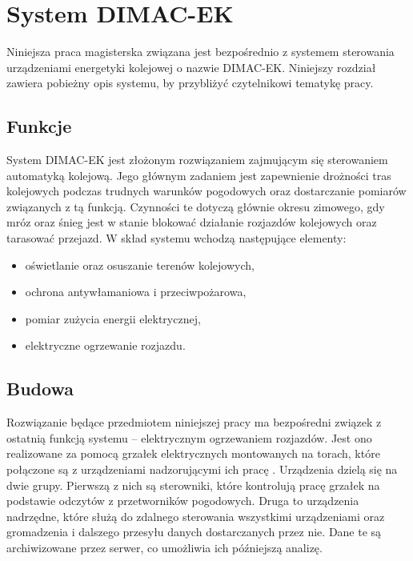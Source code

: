 \chapter{System DIMAC-EK}

Niniejsza praca magisterska związana jest bezpośrednio z systemem sterowania urządzeniami energetyki kolejowej o nazwie DIMAC-EK. Niniejszy rozdział zawiera pobieżny opis systemu, by przybliżyć czytelnikowi tematykę pracy.

\section{Funkcje}

System DIMAC-EK jest złożonym rozwiązaniem zajmującym się sterowaniem automatyką kolejową\cite{dimacek-katalog}. Jego głównym zadaniem jest zapewnienie drożności tras kolejowych podczas trudnych warunków pogodowych oraz dostarczanie pomiarów związanych z tą funkcją. Czynności te dotyczą głównie okresu zimowego, gdy mróz oraz śnieg jest w stanie blokować działanie rozjazdów kolejowych oraz tarasować przejazd. W skład systemu wchodzą następujące elementy:

\begin{itemize}
\item oświetlanie oraz osuszanie terenów kolejowych,
\item ochrona antywłamaniowa i przeciwpożarowa,
\item pomiar zużycia energii elektrycznej,
\item elektryczne ogrzewanie rozjazdu.
\end{itemize}

\section{Budowa}
Rozwiązanie będące przedmiotem niniejszej pracy ma bezpośredni związek z ostatnią funkcją systemu -- elektrycznym ogrzewaniem rozjazdów. Jest ono realizowane za pomocą grzałek elektrycznych montowanych na torach, które połączone są z urządzeniami nadzorującymi ich pracę \cite{dimacek-wytyczne}. Urządzenia dzielą się na dwie grupy. Pierwszą z nich są sterowniki, które kontrolują pracę grzałek na podstawie odczytów z przetworników pogodowych. Druga to urządzenia nadrzędne, które służą do zdalnego sterowania wszystkimi urządzeniami oraz gromadzenia i dalszego przesyłu danych dostarczanych przez nie. Dane te są archiwizowane przez serwer, co umożliwia ich późniejszą analizę.

